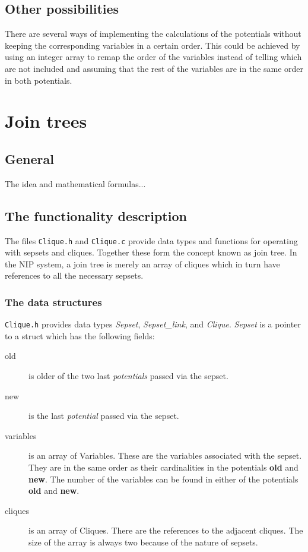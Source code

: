 \documentclass[12pt,a4paper]{report}
\begin{document}
\subsection{Other possibilities}
There are several ways of implementing the calculations of the potentials
without keeping the corresponding variables in a certain order. This
could be achieved by using an integer array to remap the order of the
variables instead of telling which are not included and assuming that
the rest of the variables are in the same order in both potentials.


\newpage
\section{Join trees} %
\subsection{General}

The idea and mathematical formulas...

\subsection{The functionality description}
The files \verb+Clique.h+ and \verb+Clique.c+ provide data types and 
functions for operating with sepsets and cliques. Together these form
the concept known as join tree. In the NIP system, a join tree is
merely an array of cliques which in turn have references to all the
necessary sepsets.

\subsubsection{The data structures}
\verb+Clique.h+ provides data types {\it Sepset}, {\it Sepset\_link}, 
and {\it Clique}. {\it Sepset} is a pointer to a struct which has the
following fields:
\begin{description}
\item[old] is older of the two last {\it potentials} passed via the sepset.

\item[new] is the last {\it potential} passed via the sepset.

\item[variables] is an {array of Variables}. These are the variables
associated with the sepset. They are in the same order as their
cardinalities in the potentials \textbf{old} and \textbf{new}. 
The number of the variables can be found in either of the potentials 
\textbf{old} and \textbf{new}.

\item[cliques] is an {array of Cliques}. There are the references to
the adjacent cliques. The size of the array is always two because of
the nature of sepsets.
\end{description}
\end{document}
